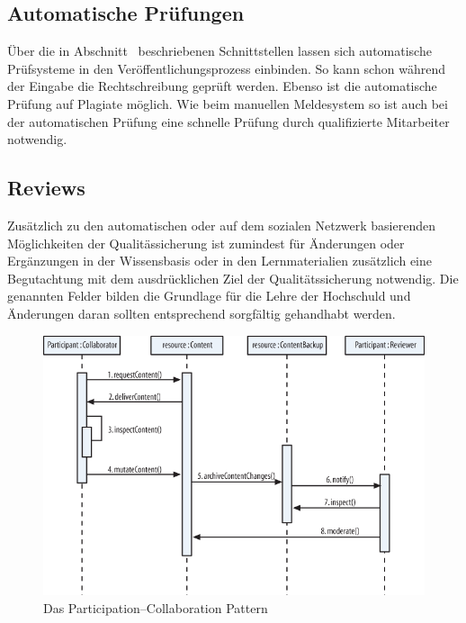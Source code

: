 \subsection{Automatische Prüfungen} %
\label{sub:prufung_auf_plagiate}
Über die in Abschnitt~ beschriebenen Schnittstellen lassen sich automatische Prüfsysteme in den Veröffentlichungsprozess einbinden. So kann schon während der Eingabe die Rechtschreibung geprüft werden. Ebenso ist die automatische Prüfung auf Plagiate möglich. Wie beim manuellen Meldesystem so ist auch bei der automatischen Prüfung eine schnelle Prüfung durch qualifizierte Mitarbeiter notwendig.

\subsection{Reviews} %
Zusätzlich zu den automatischen oder auf dem sozialen Netzwerk basierenden Möglichkeiten der Qualitässicherung ist zumindest für Änderungen oder Ergänzungen in der Wissensbasis oder in den Lernmaterialien zusätzlich eine Begutachtung mit dem ausdrücklichen Ziel der Qualitätssicherung notwendig. Die genannten Felder bilden die Grundlage für die Lehre der Hochschuld und Änderungen daran sollten entsprechend sorgfältig gehandhabt werden.

\label{sub:reviews}
\begin{figure}[H]
\begin{center}
\includegraphics[width=\textwidth]{partcollpat.png}
\caption[Das Participation–Collaboration Pattern]{Das Participation–Collaboration Pattern\footnotemark}
\label{fig:partcolpat}
\end{center}
\end{figure}

